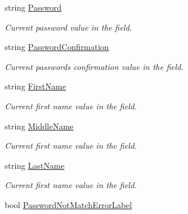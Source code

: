 \begin{DoxyCompactItemize}
string \mbox{\hyperlink{class_wpf_handler_1_1_u_i_1_1_controls_1_1_logon_1_1_registration_panel_ad0c2680bd73c2f4d9bc18f776276a98c}{Password}}
\begin{DoxyCompactList}\small\item\em Current password value in the field. \end{DoxyCompactList}\item 
string \mbox{\hyperlink{class_wpf_handler_1_1_u_i_1_1_controls_1_1_logon_1_1_registration_panel_a3cd22277d691338136b2834f3eb4b2de}{Password\+Confirmation}}
\begin{DoxyCompactList}\small\item\em Current password\textquotesingle{}s confirmation value in the field. \end{DoxyCompactList}\item 
string \mbox{\hyperlink{class_wpf_handler_1_1_u_i_1_1_controls_1_1_logon_1_1_registration_panel_ac60741ba9e6cde499f9d6c5f42c5835f}{First\+Name}}
\begin{DoxyCompactList}\small\item\em Current first name value in the field. \end{DoxyCompactList}\item 
string \mbox{\hyperlink{class_wpf_handler_1_1_u_i_1_1_controls_1_1_logon_1_1_registration_panel_a0456bb0003a90fe81d1b7e2e33203658}{Middle\+Name}}
\begin{DoxyCompactList}\small\item\em Current first name value in the field. \end{DoxyCompactList}\item 
string \mbox{\hyperlink{class_wpf_handler_1_1_u_i_1_1_controls_1_1_logon_1_1_registration_panel_a5413cdd4b2a61834dd40f460fed905d7}{Last\+Name}}
\begin{DoxyCompactList}\small\item\em Current first name value in the field. \end{DoxyCompactList}\item 
bool \mbox{\hyperlink{class_wpf_handler_1_1_u_i_1_1_controls_1_1_logon_1_1_registration_panel_a57ee6ead500ba0ecbc1ec033bedfa1ce}{Password\+Not\+Match\+Error\+Label}}

\end{DoxyCompactItemize}
